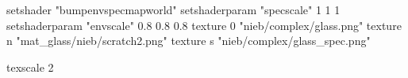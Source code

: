 setshader "bumpenvspecmapworld"
setshaderparam "specscale" 1 1 1
setshaderparam "envscale"  0.8 0.8 0.8
   texture 0 "nieb/complex/glass.png"
   texture n "mat_glass/nieb/scratch2.png"
   texture s "nieb/complex/glass_spec.png"

texscale 2